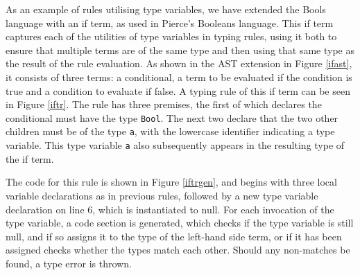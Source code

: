 \documentclass[nofilelist]{cslthse-msc}
\newcommand{\CR}[1]{\textcolor{green!60!black}{[\textbf{CR}:#1]}}
\begin{document}
%
As an example of rules utilising type variables, we have extended the Bools language with an if term, as used in Pierce's Booleans language\cite{Pierce}.
This if term captures each of the utilities of type variables in typing rules, using it both to ensure that multiple terms are of the same type and then using that same type as the result of the rule evaluation.
As shown in the AST extension in Figure \ref{ifast}, it consists of three terms: a conditional, a term to be evaluated if the condition is true and a condition to evaluate if false.
A typing rule of this if term can be seen in Figure \ref{iftr}.
The rule has three premises, the first of which declares the conditional must have the type \lstinline{Bool}.
The next two declare that the two other children must be of the type \lstinline{a}, with the lowercase identifier indicating a type variable.
This type variable \lstinline{a} also subsequently appears in the resulting type of the if term.

The code for this rule is shown in Figure \ref{iftrgen}, and begins with three local variable declarations as in previous rules, followed by a new type variable declaration on line 6, which is instantiated to null.
For each invocation of the type variable, a code section is generated, which checks if the type variable is still null, and if so assigns it to the type of the left-hand side term, or if it has been assigned checks whether the types match each other. Should any non-matches be found, a type error is thrown.
\end{document}

